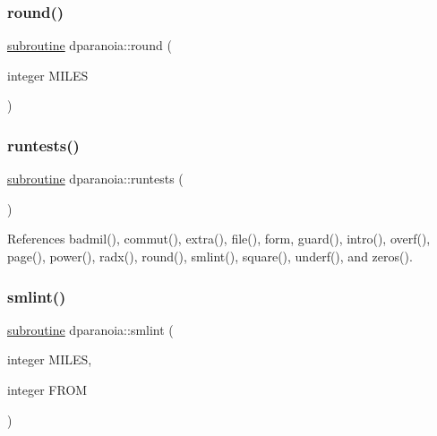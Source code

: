 \mbox{\label{dparanoia_8f90_ac9fa3597b76a0e3e3622dee7db0246cd}} 
\subsubsection{\texorpdfstring{round()}{round()}}
{\footnotesize\ttfamily \hyperlink{M__stopwatch_83_8txt_acfbcff50169d691ff02d4a123ed70482}{subroutine} dparanoia\+::round (\begin{DoxyParamCaption}\item[{integer}]{M\+I\+L\+ES }\end{DoxyParamCaption})}

\mbox{\label{dparanoia_8f90_a210778c94f0b539462736c5c6867e960}} 
\subsubsection{\texorpdfstring{runtests()}{runtests()}}
{\footnotesize\ttfamily \hyperlink{M__stopwatch_83_8txt_acfbcff50169d691ff02d4a123ed70482}{subroutine} dparanoia\+::runtests (\begin{DoxyParamCaption}{ }\end{DoxyParamCaption})}



References badmil(), commut(), extra(), file(), form, guard(), intro(), overf(), page(), power(), radx(), round(), smlint(), square(), underf(), and zeros().

\mbox{\label{dparanoia_8f90_a65decbca56a5900d39f6954e07965116}} 
\subsubsection{\texorpdfstring{smlint()}{smlint()}}
{\footnotesize\ttfamily \hyperlink{M__stopwatch_83_8txt_acfbcff50169d691ff02d4a123ed70482}{subroutine} dparanoia\+::smlint (\begin{DoxyParamCaption}\item[{integer}]{M\+I\+L\+ES,  }\item[{integer}]{F\+R\+OM }\end{DoxyParamCaption})}




